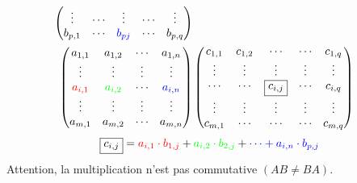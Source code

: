 \begin{definition}
\begin{enumerate}
\begin{align*}
\begin{pmatrix}
                \vdots & \cdots & \vdots & \cdots & \vdots \\
                b_{p,1} & \cdots & \color{blue}b_{pj} & \cdots & b_{p,q}
            \end{pmatrix}
            \\
            \begin{pmatrix}
                a_{1,1} & a_{1,2} & \cdots & a_{1,n} \\ 
                \vdots & \vdots & \vdots & \vdots \\
                \color{red}a_{i,1} & \color{green}a_{i,2} & \cdots & \color{blue}a_{i,n} \\ 
                \vdots & \vdots & \vdots & \vdots \\
                a_{m,1} & a_{m,2} & \cdots & a_{m,n}
            \end{pmatrix}
            &\begin{pmatrix}
                c_{1,1} & c_{1,2} & \cdots & \cdots & c_{1,q} \\
                \vdots & \vdots & \vdots & \vdots & \vdots \\
                \cdots & \cdots & \boxed{c_{i,j}} & \cdots & c_{i,q} \\
                \vdots & \vdots & \vdots & \vdots & \vdots \\
                c_{m,1} & \cdots & \cdots & \cdots & c_{m,q}
            \end{pmatrix}
        \end{align*}
        \[ \boxed{c_{i,j}} = \color{red}a_{i,1} \cdot b_{1,j} \color{black}+ \color{green} a_{i,2} \cdot b_{2,j} \color{black}+ \color{blue}\cdots + a_{i,n} \cdot b_{p,j} \]
		Attention, la multiplication n'est pas commutative $(AB \neq BA)$.
	\end{enumerate}
\end{definition}

